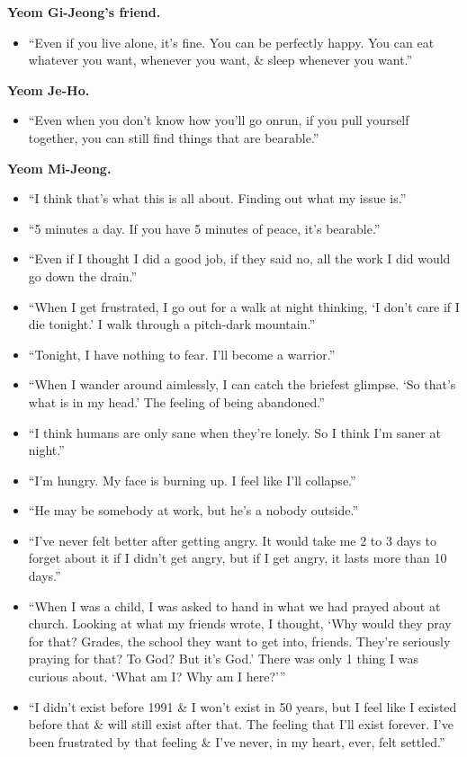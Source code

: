 \documentclass{article}
\begin{document}
\begin{enumerate}
	{\bf Yeom Gi-Jeong's friend.}
	\begin{itemize}
		\item ``Even if you live alone, it's fine. You can be perfectly happy. You can eat whatever you want, whenever you want, \& sleep whenever you want.''
	\end{itemize}
	{\bf Yeom Je-Ho.}
	\begin{itemize}
		\item ``Even when you don't know how you'll go onrun, if you pull yourself together, you can still find things that are bearable.''
	\end{itemize}
	{\bf Yeom Mi-Jeong.}
	\begin{itemize}
		\item ``I think that's what this is all about. Finding out what my issue is.''
		\item ``5 minutes a day. If you have 5 minutes of peace, it's bearable.''
		\item ``Even if I thought I did a good job, if they said no, all the work I did would go down the drain.''
		\item ``When I get frustrated, I go out for a walk at night thinking, `I don't care if I die tonight.' I walk through a pitch-dark mountain.''
		\item ``Tonight, I have nothing to fear. I'll become a warrior.''
		\item ``When I wander around aimlessly, I can catch the briefest glimpse. `So that's what is in my head.' The feeling of being abandoned.''
		\item ``I think humans are only sane when they're lonely. So I think I'm saner at night.''
		\item ``I'm hungry. My face is burning up. I feel like I'll collapse.''
		\item ``He may be somebody at work, but he's a nobody outside.''
		\item ``I've never felt better after getting angry. It would take me 2 to 3 days to forget about it if I didn't get angry, but if I get angry, it lasts more than 10 days.''
		\item ``When I was a child, I was asked to hand in what we had prayed about at church. Looking at what my friends wrote, I thought, `Why would they pray for that? Grades, the school they want to get into, friends. They're seriously praying for that? To God? But it's God.' There was only 1 thing I was curious about. `What am I? Why am I here?'''
		\item ``I didn't exist before 1991 \& I won't exist in 50 years, but I feel like I existed before that \& will still exist after that. The feeling that I'll exist forever. I've been frustrated by that feeling \& I've never, in my heart, ever, felt settled.''

\end{itemize}
\end{enumerate}
\end{document}
